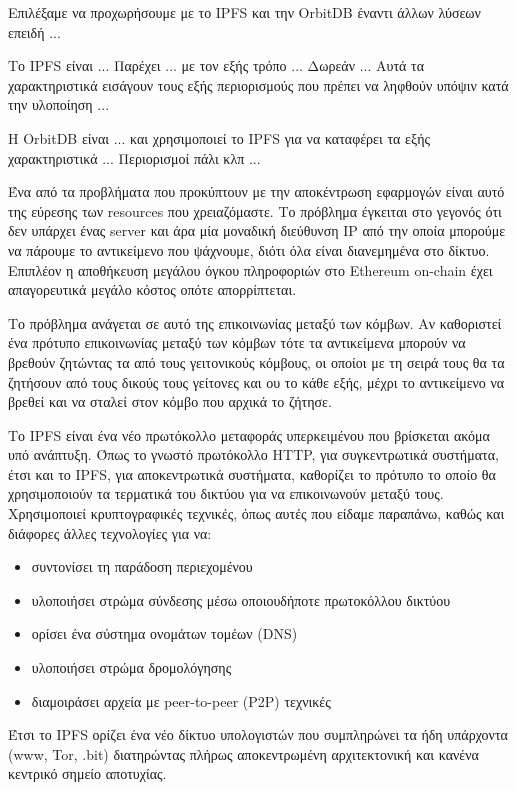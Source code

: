 Επιλέξαμε να προχωρήσουμε με το IPFS και την OrbitDB έναντι άλλων λύσεων επειδή ...

Το IPFS είναι ...
Παρέχει ... με τον εξής τρόπο ...
Δωρεάν ...
Αυτά τα χαρακτηριστικά εισάγουν τους εξής περιορισμούς που πρέπει να ληφθούν υπόψιν κατά την υλοποίηση ...

Η OrbitDB είναι ... και χρησιμοποιεί το IPFS για να καταφέρει τα εξής χαρακτηριστικά ...
Περιορισμοί πάλι κλπ ...

Ένα από τα προβλήματα που προκύπτουν με την αποκέντρωση εφαρμογών είναι αυτό της εύρεσης των resources που χρειαζόμαστε. Το πρόβλημα έγκειται στο γεγονός ότι δεν υπάρχει ένας server και άρα μία μοναδική διεύθυνση IP από την οποία μπορούμε να πάρουμε το αντικείμενο που ψάχνουμε, διότι όλα είναι διανεμημένα στο δίκτυο. Επιπλέον η αποθήκευση μεγάλου όγκου πληροφοριών στο Ethereum on-chain έχει απαγορευτικά μεγάλο κόστος οπότε απορρίπτεται.

Το πρόβλημα ανάγεται σε αυτό της επικοινωνίας μεταξύ των κόμβων. Αν καθοριστεί ένα πρότυπο επικοινωνίας μεταξύ των κόμβων τότε τα αντικείμενα μπορούν να βρεθούν ζητώντας τα από τους γειτονικούς κόμβους, οι οποίοι με τη σειρά τους θα τα ζητήσουν από τους δικούς τους γείτονες και ου το κάθε εξής, μέχρι το αντικείμενο να βρεθεί και να σταλεί στον κόμβο που αρχικά το ζήτησε.

Το IPFS είναι ένα νέο πρωτόκολλο μεταφοράς υπερκειμένου που βρίσκεται ακόμα υπό ανάπτυξη. Όπως το γνωστό πρωτόκολλο HTTP, για συγκεντρωτικά συστήματα, έτσι και το IPFS, για αποκεντρωτικά συστήματα, καθορίζει το πρότυπο το οποίο θα χρησιμοποιούν τα τερματικά του δικτύου για να επικοινωνούν μεταξύ τους. Χρησιμοποιεί κρυπτογραφικές τεχνικές, όπως αυτές που είδαμε παραπάνω, καθώς και διάφορες άλλες τεχνολογίες για να:

\begin{itemize}
    \item συντονίσει τη παράδοση περιεχομένου
    \item υλοποιήσει στρώμα σύνδεσης μέσω οποιουδήποτε πρωτοκόλλου δικτύου
    \item ορίσει ένα σύστημα ονομάτων τομέων (DNS)
    \item υλοποιήσει στρώμα δρομολόγησης
    \item διαμοιράσει αρχεία με peer-to-peer (P2P) τεχνικές
\end{itemize}

Έτσι το IPFS ορίζει ένα νέο δίκτυο υπολογιστών που συμπληρώνει τα ήδη υπάρχοντα (www, Tor, .bit) διατηρώντας πλήρως αποκεντρωμένη αρχιτεκτονική και κανένα κεντρικό σημείο αποτυχίας.


